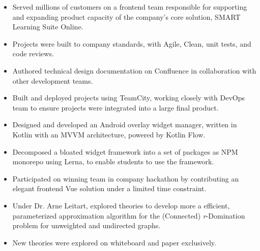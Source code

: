 \documentclass[11pt, a4paper]{article}
\begin{document}
\noindent
{
  \hfill
}

\noindent
{
  \hfill
}
\vspace{-0.08in}
\begin{itemize}
  \item Served millions of customers on a frontend team responsible for supporting and expanding product capacity of the company's core solution, SMART Learning Suite Online.
        \vspace{-0.1in}
  \item Projects were built to company standards, with Agile, Clean, unit tests, and code reviews.
        \vspace{-0.1in}
  \item Authored technical design documentation on Confluence in collaboration with other development teams.
        \vspace{-0.1in}
  \item Built and deployed projects using TeamCity, working closely with DevOps team to ensure projects were integrated into a large final product.
        \vspace{-0.1in}
  \item Designed and developed an Android overlay widget manager, written in Kotlin with an MVVM architecture, powered by Kotlin Flow.
        \vspace{-0.1in}
  \item Decomposed a bloated widget framework into a set of packages as NPM monorepo using Lerna, to enable students to use the framework.
        \vspace{-0.1in}
  \item Participated on winning team in company hackathon by contributing an elegant frontend Vue solution under a limited time constraint.
\end{itemize}
\vspace{-0.05in}

\noindent
{
  \hfill
}

\noindent
{
  \hfill
}
\vspace{-0.08in}
\begin{itemize}
  \item Under Dr. Arne Leitart, explored theories to develop more a efficient, parameterized
        approximation algorithm for the (Connected) {\it r}-Domination problem for unweighted
        and undirected graphs.
        \vspace{-0.1in}
  \item New theories were explored on whiteboard and paper exclusively.
\end{itemize}
\vspace{-0.15in}
\end{document}
